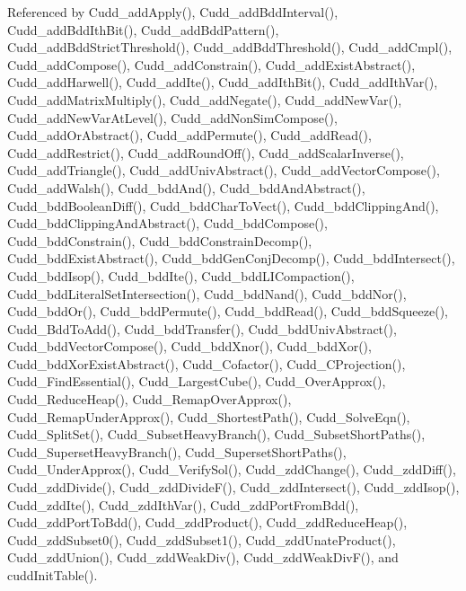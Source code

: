Referenced by Cudd\_\-add\-Apply(), Cudd\_\-add\-Bdd\-Interval(), Cudd\_\-add\-Bdd\-Ith\-Bit(), Cudd\_\-add\-Bdd\-Pattern(), Cudd\_\-add\-Bdd\-Strict\-Threshold(), Cudd\_\-add\-Bdd\-Threshold(), Cudd\_\-add\-Cmpl(), Cudd\_\-add\-Compose(), Cudd\_\-add\-Constrain(), Cudd\_\-add\-Exist\-Abstract(), Cudd\_\-add\-Harwell(), Cudd\_\-add\-Ite(), Cudd\_\-add\-Ith\-Bit(), Cudd\_\-add\-Ith\-Var(), Cudd\_\-add\-Matrix\-Multiply(), Cudd\_\-add\-Negate(), Cudd\_\-add\-New\-Var(), Cudd\_\-add\-New\-Var\-At\-Level(), Cudd\_\-add\-Non\-Sim\-Compose(), Cudd\_\-add\-Or\-Abstract(), Cudd\_\-add\-Permute(), Cudd\_\-add\-Read(), Cudd\_\-add\-Restrict(), Cudd\_\-add\-Round\-Off(), Cudd\_\-add\-Scalar\-Inverse(), Cudd\_\-add\-Triangle(), Cudd\_\-add\-Univ\-Abstract(), Cudd\_\-add\-Vector\-Compose(), Cudd\_\-add\-Walsh(), Cudd\_\-bdd\-And(), Cudd\_\-bdd\-And\-Abstract(), Cudd\_\-bdd\-Boolean\-Diff(), Cudd\_\-bdd\-Char\-To\-Vect(), Cudd\_\-bdd\-Clipping\-And(), Cudd\_\-bdd\-Clipping\-And\-Abstract(), Cudd\_\-bdd\-Compose(), Cudd\_\-bdd\-Constrain(), Cudd\_\-bdd\-Constrain\-Decomp(), Cudd\_\-bdd\-Exist\-Abstract(), Cudd\_\-bdd\-Gen\-Conj\-Decomp(), Cudd\_\-bdd\-Intersect(), Cudd\_\-bdd\-Isop(), Cudd\_\-bdd\-Ite(), Cudd\_\-bdd\-LICompaction(), Cudd\_\-bdd\-Literal\-Set\-Intersection(), Cudd\_\-bdd\-Nand(), Cudd\_\-bdd\-Nor(), Cudd\_\-bdd\-Or(), Cudd\_\-bdd\-Permute(), Cudd\_\-bdd\-Read(), Cudd\_\-bdd\-Squeeze(), Cudd\_\-Bdd\-To\-Add(), Cudd\_\-bdd\-Transfer(), Cudd\_\-bdd\-Univ\-Abstract(), Cudd\_\-bdd\-Vector\-Compose(), Cudd\_\-bdd\-Xnor(), Cudd\_\-bdd\-Xor(), Cudd\_\-bdd\-Xor\-Exist\-Abstract(), Cudd\_\-Cofactor(), Cudd\_\-CProjection(), Cudd\_\-Find\-Essential(), Cudd\_\-Largest\-Cube(), Cudd\_\-Over\-Approx(), Cudd\_\-Reduce\-Heap(), Cudd\_\-Remap\-Over\-Approx(), Cudd\_\-Remap\-Under\-Approx(), Cudd\_\-Shortest\-Path(), Cudd\_\-Solve\-Eqn(), Cudd\_\-Split\-Set(), Cudd\_\-Subset\-Heavy\-Branch(), Cudd\_\-Subset\-Short\-Paths(), Cudd\_\-Superset\-Heavy\-Branch(), Cudd\_\-Superset\-Short\-Paths(), Cudd\_\-Under\-Approx(), Cudd\_\-Verify\-Sol(), Cudd\_\-zdd\-Change(), Cudd\_\-zdd\-Diff(), Cudd\_\-zdd\-Divide(), Cudd\_\-zdd\-Divide\-F(), Cudd\_\-zdd\-Intersect(), Cudd\_\-zdd\-Isop(), Cudd\_\-zdd\-Ite(), Cudd\_\-zdd\-Ith\-Var(), Cudd\_\-zdd\-Port\-From\-Bdd(), Cudd\_\-zdd\-Port\-To\-Bdd(), Cudd\_\-zdd\-Product(), Cudd\_\-zdd\-Reduce\-Heap(), Cudd\_\-zdd\-Subset0(), Cudd\_\-zdd\-Subset1(), Cudd\_\-zdd\-Unate\-Product(), Cudd\_\-zdd\-Union(), Cudd\_\-zdd\-Weak\-Div(), Cudd\_\-zdd\-Weak\-Div\-F(), and cudd\-Init\-Table().
